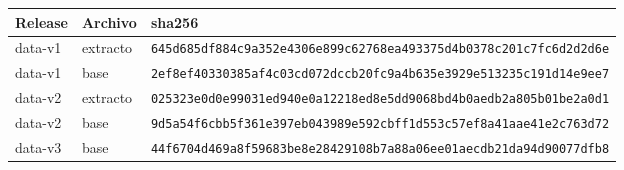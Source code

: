 \begin{tabular}{lll}
\toprule
Release & Archivo & sha256 \\
\midrule
data-v1 & extracto & \texttt{645d685df884c9a352e4306e899c62768ea493375d4b0378c201c7fc6d2d2d6e} \\
data-v1 & base & \texttt{2ef8ef40330385af4c03cd072dccb20fc9a4b635e3929e513235c191d14e9ee7} \\
data-v2 & extracto & \texttt{025323e0d0e99031ed940e0a12218ed8e5dd9068bd4b0aedb2a805b01be2a0d1} \\
data-v2 & base & \texttt{9d5a54f6cbb5f361e397eb043989e592cbff1d553c57ef8a41aae41e2c763d72} \\
data-v3 & base & \texttt{44f6704d469a8f59683be8e28429108b7a88a06ee01aecdb21da94d90077dfb8} \\
\bottomrule
\end{tabular}
